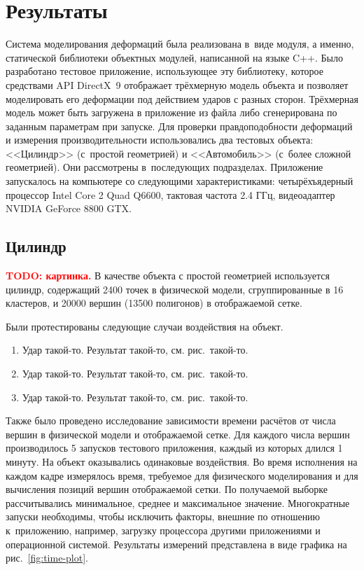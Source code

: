 \documentclass[a4paper, 14pt, titlepage]{extarticle}
\newcommand{\todo}[1]{\textbf{\textcolor{red}{TODO: #1}}}
\let\oldsection\section
\renewcommand{\section}{\newpage\oldsection}
\begin{document}
  \section{Результаты}\label{sec:results}

    Система моделирования деформаций была реализована в~виде модуля, а именно, статической
    библиотеки объектных модулей, написанной на языке C++.
    Было разработано тестовое приложение, использующее эту библиотеку, которое
    средствами API DirectX~9 отображает трёхмерную модель объекта и позволяет моделировать его
    деформации под действием ударов с разных сторон. Трёхмерная модель может быть загружена в
    приложение из файла либо сгенерирована по заданным параметрам при запуске. Для проверки правдоподобности
    деформаций и измерения производительности использовались два тестовых объекта: <<Цилиндр>> (с~простой
    геометрией) и <<Автомобиль>> (с~более сложной геометрией).  Они рассмотрены в~последующих
    подразделах. Приложение запускалось на компьютере со следующими характеристиками:
    четырёхъядерный процессор Intel Core 2 Quad Q6600, тактовая частота 2.4 ГГц, видеоадаптер NVIDIA
    GeForce 8800 GTX.

    \subsection{Цилиндр}

      \todo{картинка.} В качестве объекта с простой геометрией используется цилиндр, содержащий
      2400 точек в физической модели, сгруппированные в 16 кластеров, и 20000 вершин (13500
      полигонов) в отображаемой сетке.

      Были протестированы следующие случаи воздействия на объект.
      \begin{enumerate}
        \item Удар такой-то. Результат такой-то, см. рис.~такой-то.
        \item Удар такой-то. Результат такой-то, см. рис.~такой-то.
        \item Удар такой-то. Результат такой-то, см. рис.~такой-то.
      \end{enumerate}

      Также было проведено исследование зависимости времени расчётов от числа вершин в физической
      модели и отображаемой сетке. Для каждого числа вершин производилось 5 запусков тестового
      приложения, каждый из которых длился 1 минуту. На объект оказывались одинаковые воздействия. Во время
      исполнения на каждом кадре измерялось время, требуемое для физического моделирования и для
      вычисления позиций вершин отображаемой сетки. По получаемой выборке рассчитывались
      минимальное, среднее и максимальное значение. Многократные запуски необходимы, чтобы исключить
      факторы, внешние по отношению к~приложению, например, загрузку процессора другими приложениями
      и операционной системой. Результаты измерений представлена в виде графика на рис.~\ref{fig:time-plot}.
\end{document}
